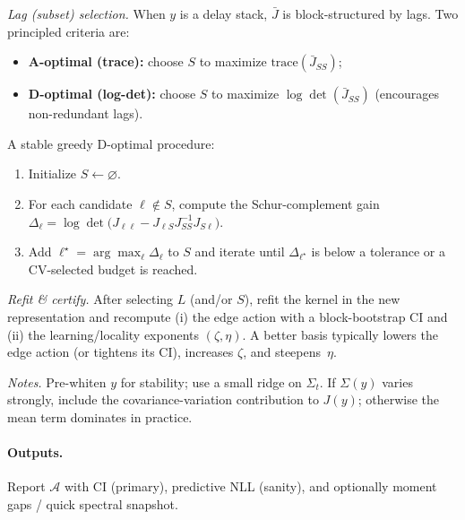 \documentclass[11pt]{article}
\newcommand{\1}{\mathbf{1}}
\begin{document}
\emph{Lag (subset) selection.} When $y$ is a delay stack, $\bar J$ is block-structured by lags.
Two principled criteria are:
\begin{itemize}[leftmargin=1.4em,itemsep=1pt,topsep=2pt]
\item \textbf{A-optimal (trace):} choose $S$ to maximize $\mathrm{trace}(\bar J_{SS})$;
\item \textbf{D-optimal (log-det):} choose $S$ to maximize $\log\det(\bar J_{SS})$ (encourages non-redundant lags).
\end{itemize}
A stable greedy D-optimal procedure:
\begin{enumerate}[leftmargin=1.4em,itemsep=1pt,topsep=2pt]
\item Initialize $S\gets\varnothing$.
\item For each candidate $\ell\notin S$, compute the Schur-complement gain
$\Delta_\ell=\log\det\!\big(J_{\ell\ell}-J_{\ell S}J_{SS}^{-1}J_{S\ell}\big)$.
\item Add $\ell^\star=\arg\max_\ell \Delta_\ell$ to $S$ and iterate until $\Delta_{\ell^\star}$ is below a tolerance or a CV-selected budget is reached.
\end{enumerate}

\emph{Refit \& certify.} After selecting $L$ (and/or $S$), refit the kernel in the new representation and
recompute (i) the edge action with a block-bootstrap CI and (ii) the learning/locality exponents $(\zeta,\eta)$.
A better basis typically lowers the edge action (or tightens its CI), increases $\zeta$, and steepens~$\eta$.

\emph{Notes.} Pre-whiten $y$ for stability; use a small ridge on $\Sigma_t$.
If $\Sigma(y)$ varies strongly, include the covariance-variation contribution to $J(y)$; otherwise the mean term dominates in practice.


\paragraph{Outputs.}
Report \(\mathcal A\) with CI (primary), predictive NLL (sanity), and optionally moment gaps / quick spectral snapshot. 

\end{document}
